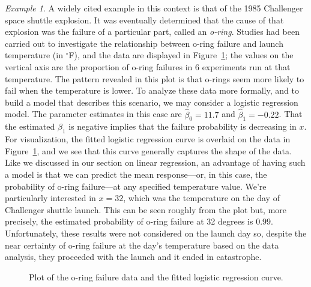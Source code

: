\documentclass[a4paper, 12pt]{article}
\theoremstyle{plain}
\theoremstyle{definition}
\theoremstyle{remark}
\newtheorem*{example}{Example}
\begin{document}
\begin{example}
A widely cited example in this context is that of the 1985 Challenger space shuttle explosion.  It was eventually determined that the cause of that explosion was the failure of a particular part, called an {\em o-ring}.  Studies had been carried out to investigate the relationship between o-ring failure and launch temperature (in $^\circ$F), and the data are displayed in Figure~\ref{fig:logistic}; the values on the vertical axis are the proportion of o-ring failures in 6 experiments run at that temperature.  The pattern revealed in this plot is that o-rings seem more likely to fail when the temperature is lower.  To analyze these data more formally, and to build a model that describes this scenario, we may consider a logistic regression model.  The parameter estimates in this case are $\hat\beta_0 = 11.7$ and $\hat\beta_1=-0.22$.  That the estimated $\beta_1$ is negative implies that the failure probability is decreasing in $x$.  For visualization, the fitted logistic regression curve is overlaid on the data in Figure~\ref{fig:logistic}, and we see that this curve generally captures the shape of the data.  Like we discussed in our section on linear regression, an advantage of having such a model is that we can predict the mean response---or, in this case, the probability of o-ring failure---at any specified temperature value.  We're particularly interested in $x=32$, which was the temperature on the day of Challenger shuttle launch.  This can be seen roughly from the plot but, more precisely, the estimated probability of o-ring failure at 32 degrees is 0.99.  Unfortunately, these results were not considered on the launch day so, despite the near certainty of o-ring failure at the day's temperature based on the data analysis, they proceeded with the launch and it ended in catastrophe. 
\end{example}

\begin{figure}[t]
\begin{center}
\end{center}
\caption{Plot of the o-ring failure data and the fitted logistic regression curve.}
\label{fig:logistic}
\end{figure}

\vfill



%
%


  
\end{document}
